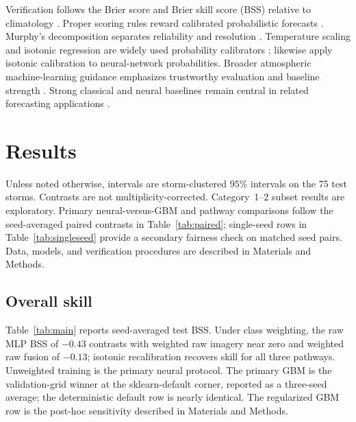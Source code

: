 \documentclass[11pt]{article}
\begin{document}
Verification follows the Brier score and Brier skill score (BSS) relative to climatology \citep{brier1950,hsu1986,wilks2011}. Proper scoring rules reward calibrated probabilistic forecasts \citep{gneiting2007}. Murphy's decomposition separates reliability and resolution \citep{murphy1973}. Temperature scaling and isotonic regression are widely used probability calibrators \citep{guo2017,niculescu2005}; \citet{lagerquist2025} likewise apply isotonic calibration to neural-network probabilities. Broader atmospheric machine-learning guidance emphasizes trustworthy evaluation and baseline strength \citep{mcgovern2019,mcgovern2019b,ebertuphoff2021,chase2022}. Strong classical and neural baselines remain central in related forecasting applications \citep{gagne2019,rasp2020}.

\section{Results}
\label{sec:results}

Unless noted otherwise, intervals are storm-clustered $95\%$ intervals on the 75 test storms. Contrasts are not multiplicity-corrected. Category~1--2 subset results are exploratory. Primary neural-versus-GBM and pathway comparisons follow the seed-averaged paired contrasts in Table~\ref{tab:paired}; single-seed rows in Table~\ref{tab:singleseed} provide a secondary fairness check on matched seed pairs. Data, models, and verification procedures are described in Materials and Methods.

\subsection{Overall skill}

Table~\ref{tab:main} reports seed-averaged test BSS. Under class weighting, the raw MLP BSS of $-0.43$ contrasts with weighted raw imagery near zero and weighted raw fusion of $-0.13$; isotonic recalibration recovers skill for all three pathways. Unweighted training is the primary neural protocol. The primary GBM is the validation-grid winner at the sklearn-default corner, reported as a three-seed average; the deterministic default row is nearly identical. The regularized GBM row is the post-hoc sensitivity described in Materials and Methods.
\end{document}
